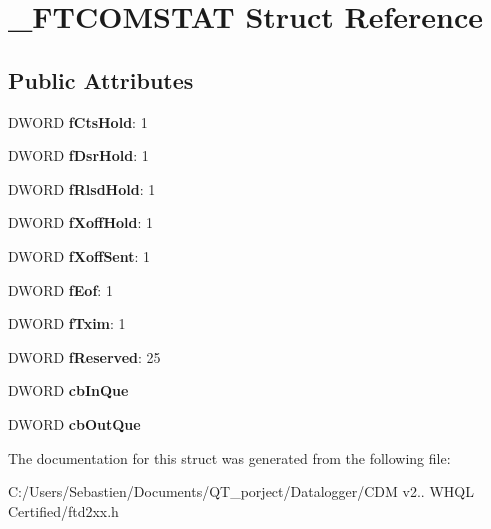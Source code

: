 \hypertarget{struct___f_t_c_o_m_s_t_a_t}{}\section{\+\_\+\+F\+T\+C\+O\+M\+S\+T\+AT Struct Reference}
\label{struct___f_t_c_o_m_s_t_a_t}
\subsection*{Public Attributes}
\begin{DoxyCompactItemize}
\item 
\mbox{\label{struct___f_t_c_o_m_s_t_a_t_ad78060ad831dfa35a9e2db1103a54c3f}} 
D\+W\+O\+RD {\bfseries f\+Cts\+Hold}\+: 1
\item 
\mbox{\label{struct___f_t_c_o_m_s_t_a_t_a63c6ff1a00dd690b0bf9347c949a59c8}} 
D\+W\+O\+RD {\bfseries f\+Dsr\+Hold}\+: 1
\item 
\mbox{\label{struct___f_t_c_o_m_s_t_a_t_afb2b9a88896f528efbe6c9ff73b7744c}} 
D\+W\+O\+RD {\bfseries f\+Rlsd\+Hold}\+: 1
\item 
\mbox{\label{struct___f_t_c_o_m_s_t_a_t_a5b2fd786cc95e60df49aa55f7d4d7d5a}} 
D\+W\+O\+RD {\bfseries f\+Xoff\+Hold}\+: 1
\item 
\mbox{\label{struct___f_t_c_o_m_s_t_a_t_a5a28cf3c2aea49110593931c78934416}} 
D\+W\+O\+RD {\bfseries f\+Xoff\+Sent}\+: 1
\item 
\mbox{\label{struct___f_t_c_o_m_s_t_a_t_a2a4cdfc245e72f74b032f7a5cc220fd3}} 
D\+W\+O\+RD {\bfseries f\+Eof}\+: 1
\item 
\mbox{\label{struct___f_t_c_o_m_s_t_a_t_a04853d07abaf4fb47891a3bbdd78be8d}} 
D\+W\+O\+RD {\bfseries f\+Txim}\+: 1
\item 
\mbox{\label{struct___f_t_c_o_m_s_t_a_t_a567f611e7f3dc193ff94ac4c44fbc500}} 
D\+W\+O\+RD {\bfseries f\+Reserved}\+: 25
\item 
\mbox{\label{struct___f_t_c_o_m_s_t_a_t_a995717c2425e3e52f046565bb60fbb3d}} 
D\+W\+O\+RD {\bfseries cb\+In\+Que}
\item 
\mbox{\label{struct___f_t_c_o_m_s_t_a_t_ab0fbaa7889620e204d2f583b6e31f848}} 
D\+W\+O\+RD {\bfseries cb\+Out\+Que}
\end{DoxyCompactItemize}


The documentation for this struct was generated from the following file\+:\begin{DoxyCompactItemize}
\item 
C\+:/\+Users/\+Sebastien/\+Documents/\+Q\+T\+\_\+porject/\+Datalogger/\+C\+D\+M v2.. W\+H\+Q\+L Certified/ftd2xx.\+h\end{DoxyCompactItemize}
